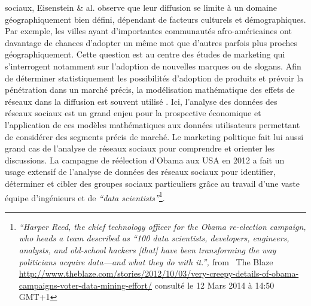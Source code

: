 sociaux, Eisenstein \& al. \citep{Eisenstein2012} observe que leur diffusion se limite à un domaine géographiquement bien défini, dépendant de facteurs culturels et démographiques. Par exemple, les villes ayant d{\textquoteright}importantes communautés afro-américaines ont davantage de chances d{\textquoteright}adopter un m\^eme mot que d{\textquoteright}autres parfois plus proches géographiquement. Cette question est au centre des études de marketing qui s{\textquoteright}interrogent notamment sur l{\textquoteright}adoption de nouvelles marques ou de slogans. Afin de déterminer statistiquement les possibilités d{\textquoteright}adoption de produits et prévoir la pénétration dans un marché précis, la modélisation mathématique des effets de réseaux dans la diffusion est souvent utilisé \citep{Bass1994}. Ici, l{\textquoteright}analyse des données des réseaux sociaux est un grand enjeu pour la prospective économique et l{\textquoteright}application de ces modèles mathématiques aux données utilisateurs permettant de considérer des segments précis de marché. Le marketing politique fait lui aussi grand cas de l{\textquoteright}analyse de réseaux sociaux pour comprendre et orienter les discussions. La campagne de réélection d{\textquoteright}Obama aux USA en 2012 a fait un usage extensif de l{\textquoteright}analyse de données des réseaux sociaux pour identifier, déterminer et cibler des groupes sociaux particuliers gr\^ace au travail d{\textquoteright}une vaste équipe d{\textquoteright}ingénieurs et de \textit{{\textquotedblleft}data scientists{\textquotedblright}}\footnote{ \textit{{\textquotedblleft}Harper Reed, the chief technology officer for the Obama re-election campaign, who heads a team described as {\textquotedblleft}100 data scientists, developers, engineers, analysts, and old-school hackers [that] have been transforming the way politicians acquire data---and what they do with it.{\textquotedblright}, }from \ The Blaze \url{http://www.theblaze.com/stories/2012/10/03/very-creepy-details-of-obama-campaigns-voter-data-mining-effort/} consulté le 12 Mars 2014 à 14:50 GMT+1}. 

